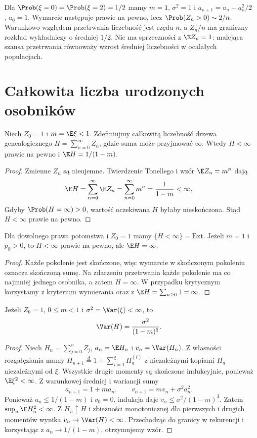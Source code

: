 \begin{przyklad}
Dla $\Prob(\xi=0)=\Prob(\xi=2)=1/2$ mamy
$m=1$, $\sigma^2=1$ i
$a_{n+1}=a_n-a_n^2/2$, $a_0=1$.
Wymarcie następuje prawie na pewno, lecz
$\Prob(Z_n>0)\sim2/n$.
Warunkowo względem przetrwania liczebność jest
rzędu $n$, a $Z_n/n$ ma graniczny rozkład
wykładniczy o średniej $1/2$.
Nie ma sprzeczności z $\E Z_n=1$:
malejąca szansa przetrwania równoważy wzrost
średniej liczebności w ocalałych populacjach.
\end{przyklad}

\section{Całkowita liczba urodzonych osobników}
\begin{twierdzenie}
Niech $Z_0=1$ i $m=\E\xi<1$.
Zdefiniujmy całkowitą liczebność drzewa genealogicznego
$H=\sum_{n=0}^\infty Z_n$, gdzie suma może przyjmować $\infty$.
Wtedy $H<\infty$ prawie na pewno i
$\E H=1/(1-m)$.
\end{twierdzenie}
\begin{proof}
Zmienne $Z_n$ są nieujemne. Twierdzenie Tonellego
i wzór $\E Z_n=m^n$ dają
\[
\E H=\sum_{n=0}^\infty\E Z_n=\sum_{n=0}^\infty m^n
=\frac{1}{1-m}<\infty.
\]
Gdyby $\Prob(H=\infty)>0$, wartość oczekiwana $H$
byłaby nieskończona. Stąd $H<\infty$ prawie na pewno.
\end{proof}

\begin{wniosek}
Dla dowolnego prawa potomstwa i $Z_0=1$ mamy
$\{H<\infty\}=\mathrm{Ext}$.
Jeżeli $m=1$ i $p_0>0$, to $H<\infty$ prawie
na pewno, ale $\E H=\infty$.
\end{wniosek}
\begin{proof}
Każde pokolenie jest skończone, więc wymarcie
w skończonym pokoleniu oznacza skończoną sumę.
Na zdarzeniu przetrwania każde pokolenie ma
co najmniej jednego osobnika, a zatem $H=\infty$.
W przypadku krytycznym korzystamy z kryterium
wymierania oraz z $\E H=\sum_{n\ge0}1=\infty$.
\end{proof}

\begin{twierdzenie}
Jeżeli $Z_0=1$, $0\le m<1$ i
$\sigma^2=\Var(\xi)<\infty$, to
\[
\Var(H)=\frac{\sigma^2}{(1-m)^3}.
\]
\end{twierdzenie}
\begin{proof}
Niech $H_n=\sum_{j=0}^nZ_j$, $a_n=\E H_n$
i $v_n=\Var(H_n)$. Z własności rozgałęziania
mamy $H_{n+1}\overset{d}=1+\sum_{i=1}^{\xi}H_n^{(i)}$
z niezależnymi kopiami $H_n$ niezależnymi od $\xi$.
Wszystkie drugie momenty są skończone indukcyjnie,
ponieważ $\E\xi^2<\infty$.
Z warunkowej średniej i wariancji sumy
\[
a_{n+1}=1+ma_n,\qquad
v_{n+1}=mv_n+\sigma^2 a_n^2.
\]
Ponieważ $a_n\le1/(1-m)$ i $v_0=0$,
indukcja daje $v_n\le \sigma^2/(1-m)^3$.
Zatem $\sup_n\E H_n^2<\infty$.
Z $H_n\uparrow H$ i zbieżności monotonicznej
dla pierwszych i drugich momentów wynika
$v_n\to\Var(H)<\infty$.
Przechodząc do granicy w rekurencji i korzystając
z $a_n\to1/(1-m)$, otrzymujemy wzór.
\end{proof}


